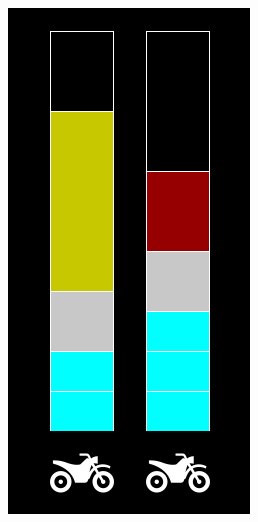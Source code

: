 \documentclass[12pt, a4paper]{article}
\begin{document}
\begin{figure}[H]
    \centering
    \begin{minipage}{0.32\textwidth}
        \includegraphics[width=\textwidth]{res/Empacotamento.png}

\end{minipage}
\end{figure}
\end{document}
